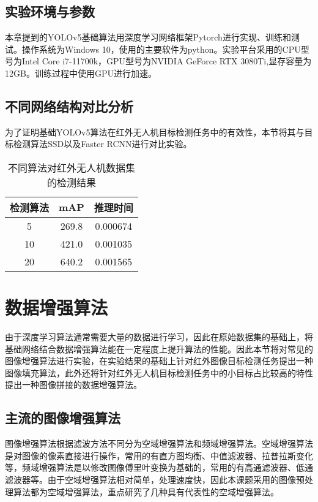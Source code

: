 \subsection{实验环境与参数}
本章提到的YOLOv5基础算法用深度学习网络框架Pytorch进行实现、训练和测试。操作系统为Windows 10，使用的主要软件为python。实验平台采用的CPU型号为Intel Core i7-11700k，GPU型号为NVIDIA GeForce RTX 3080Ti,显存容量为12GB。训练过程中使用GPU进行加速。

\subsection{不同网络结构对比分析}
为了证明基础YOLOv5算法在红外无人机目标检测任务中的有效性，本节将其与目标检测算法SSD以及Faster RCNN进行对比实验。

\begin{table}[htbp]
  \caption{不同算法对红外无人机数据集的检测结果}
  \vspace{0.5em}\centering\wuhao
  \begin{tabular}{ccc}
  \toprule
  检测算法 & mAP & 推理时间\\
  \midrule
   5 & 269.8 & 0.000674\\
  10 & 421.0 & 0.001035\\
  20 & 640.2 & 0.001565\\
  \bottomrule
  \end{tabular}
\end{table}

\section{数据增强算法}
由于深度学习算法通常需要大量的数据进行学习，因此在原始数据集的基础上，将基础网络结合数据增强算法能在一定程度上提升算法的性能。因此本节将对常见的图像增强算法进行实验，在实验结果的基础上针对红外图像目标检测任务提出一种图像填充算法，此外还将针对红外无人机目标检测任务中的小目标占比较高的特性提出一种图像拼接的数据增强算法。

\subsection{主流的图像增强算法}
图像增强算法根据滤波方法不同分为空域增强算法和频域增强算法。空域增强算法是对图像的像素直接进行操作，常用的有直方图均衡、中值滤波器、拉普拉斯变化等，频域增强算法是以修改图像傅里叶变换为基础的，常用的有高通滤波器、低通滤波器等。由于空域增强算法相对简单，处理速度快，因此本课题采用的图像预处理算法都为空域增强算法，重点研究了几种具有代表性的空域增强算法。

